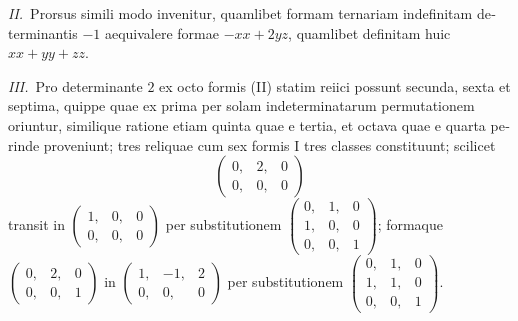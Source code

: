 \documentclass[12pt,a4paper]{article}
\theoremstyle{plain}
\theoremstyle{definition}
\theoremstyle{remark}
\begin{document}
\begin{otherlanguage}{latin}
\textit{II.}\ Prorsus simili modo invenitur, quamlibet formam ternariam indefinitam determinantis $-1$ aequivalere formae $-xx + 2yz$, quamlibet definitam huic $xx + yy + zz$.

\textit{III.}\ Pro determinante $2$ ex octo formis (II) statim reiici possunt secunda, sexta et septima, quippe quae ex prima per solam indeterminatarum permutationem oriuntur, similique ratione etiam quinta quae e tertia, et octava quae e quarta perinde proveniunt; tres reliquae cum sex formis I tres classes constituunt; scilicet
\[
\begin{pmatrix} 0, & 2, & 0 \\ 0, & 0, & 0 \end{pmatrix}
\]
transit in $\begin{pmatrix} 1, & 0, & 0 \\ 0, & 0, & 0 \end{pmatrix}$ per substitutionem $\begin{pmatrix} 0, & 1, & 0 \\ 1, & 0, & 0 \\ 0, & 0, & 1 \end{pmatrix}$; formaque $\begin{pmatrix} 0, & 2, & 0 \\ 0, & 0, & 1 \end{pmatrix}$ in $\begin{pmatrix} 1, & -1, & 2 \\ 0, & 0, & 0 \end{pmatrix}$ per substitutionem $\begin{pmatrix} 0, & 1, & 0 \\ 1, & 1, & 0 \\ 0, & 0, & 1 \end{pmatrix}$.


\end{otherlanguage}
\end{document}
